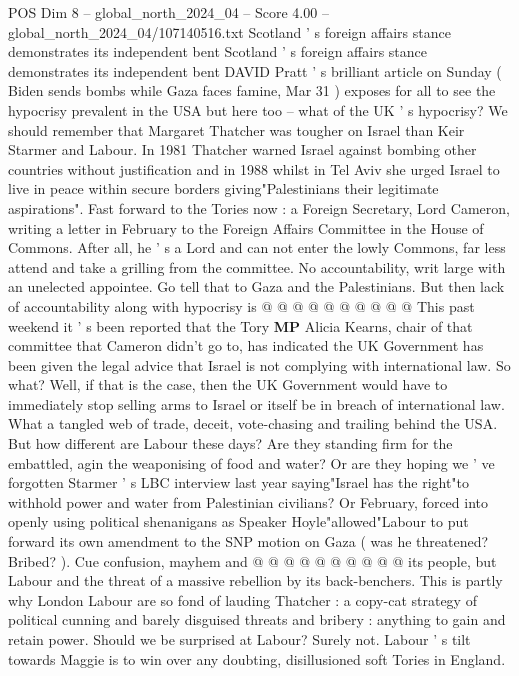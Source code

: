 \begin{textsample}{POS Dim 8 – global\_north\_2024\_04 – Score 4.00 – global\_north\_2024\_04/107140516.txt}  \label{ex:f8_pos_317}
Scotland ' s foreign affairs stance demonstrates its independent bent Scotland ' s foreign affairs stance demonstrates its independent bent DAVID Pratt ' s brilliant article on Sunday ( Biden sends bombs while Gaza faces famine, Mar 31 ) exposes for all to see the hypocrisy prevalent in the USA but here too -- what of the UK ' s hypocrisy?
We should remember that Margaret Thatcher was tougher on Israel than Keir Starmer and Labour.
In 1981 Thatcher warned Israel against bombing other countries without justification and in 1988 whilst in Tel Aviv she urged Israel to live in peace within secure borders giving"Palestinians their legitimate aspirations".
Fast forward to the Tories now : a Foreign Secretary, Lord Cameron, writing a letter in February to the Foreign Affairs Committee in the House of Commons.
After all, he ' s a Lord and can not enter the lowly Commons, far less attend and take a grilling from the committee.
No accountability, writ large with an unelected appointee.
Go tell that to Gaza and the Palestinians.
But then lack of accountability along with hypocrisy is @ @ @ @ @ @ @ @ @ @ This past weekend it ' s been reported that the Tory \textbf{MP} Alicia Kearns, chair of that committee that Cameron didn't go to, has indicated the UK Government has been given the legal advice that Israel is not complying with international law.
So what?
Well, if that is the case, then the UK Government would have to immediately stop selling arms to Israel or itself be in breach of international law.
What a tangled web of trade, deceit, vote-chasing and trailing behind the USA.
But how different are Labour these days?
Are they standing firm for the embattled, agin the weaponising of food and water?
Or are they hoping we ' ve forgotten Starmer ' s LBC interview last year saying"Israel has the right"to withhold power and water from Palestinian civilians?
Or February, forced into openly using political shenanigans as Speaker Hoyle"allowed"Labour to put forward its own amendment to the SNP motion on Gaza ( was he threatened?
Bribed? ).
Cue confusion, mayhem and @ @ @ @ @ @ @ @ @ @ its people, but Labour and the threat of a massive rebellion by its back-benchers.
This is partly why London Labour are so fond of lauding Thatcher : a copy-cat strategy of political cunning and barely disguised threats and bribery : anything to gain and retain power.
Should we be surprised at Labour?
Surely not.
Labour ' s tilt towards Maggie is to win over any doubting, disillusioned soft Tories in England.

\end{textsample}
